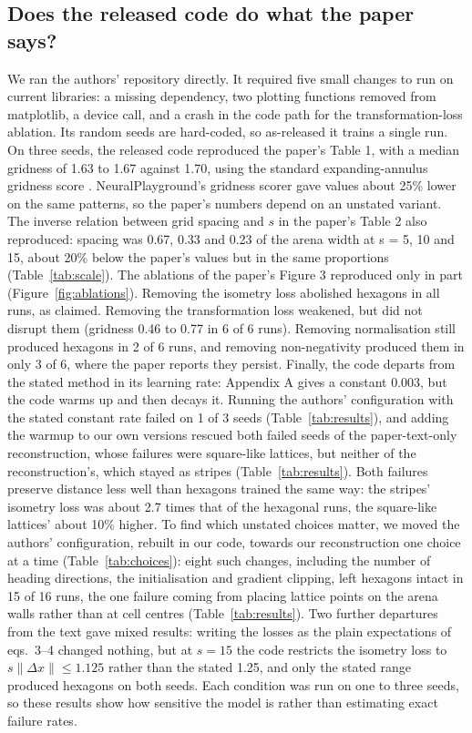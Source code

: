 \documentclass[10pt,letterpaper]{article}
\begin{document}
\subsection{Does the released code do what the paper says?} \label{sec:released}
We ran the authors’ repository directly. It required five small changes to run on current libraries: a missing dependency, two plotting functions removed from matplotlib, a device call, and a crash in the code path for the transformation-loss ablation. Its random seeds are hard-coded, so as-released it trains a single run. On three seeds, the released code reproduced the paper's Table 1, with a median gridness of 1.63 to 1.67 against 1.70, using the standard expanding-annulus gridness score \citep[as in][]{gao2021path}. NeuralPlayground’s gridness scorer gave values about 25\% lower on the same patterns, so the paper’s numbers depend on an unstated variant. The inverse relation between grid spacing and $s$ in the paper's Table 2 also reproduced: spacing was 0.67, 0.33 and 0.23 of the arena width at s = 5, 10 and 15, about 20\% below the paper’s values but in the same proportions (Table~\ref{tab:scale}). The ablations of the paper's Figure 3 reproduced only in part (Figure~\ref{fig:ablations}). Removing the isometry loss abolished hexagons in all runs, as claimed. Removing the transformation loss weakened, but did not disrupt them (gridness 0.46 to 0.77 in 6 of 6 runs). Removing normalisation still produced hexagons in 2 of 6 runs, and removing non-negativity produced them in only 3 of 6, where the paper reports they persist. Finally, the code departs from the stated method in its learning rate: Appendix A gives a constant 0.003, but the code warms up and then decays it. Running the authors’ configuration with the stated constant rate failed on 1 of 3 seeds (Table~\ref{tab:results}), and adding the warmup to our own versions rescued both failed seeds of the paper-text-only reconstruction, whose failures were square-like lattices, but neither of the reconstruction's, which stayed as stripes (Table~\ref{tab:results}). Both failures preserve distance less well than hexagons trained the same way: the stripes' isometry loss was about 2.7 times that of the hexagonal runs, the square-like lattices' about 10\% higher. To find which unstated choices matter, we moved the authors' configuration, rebuilt in our code, towards our reconstruction one choice at a time (Table~\ref{tab:choices}): eight such changes, including the number of heading directions, the initialisation and gradient clipping, left hexagons intact in 15 of 16 runs, the one failure coming from placing lattice points on the arena walls rather than at cell centres (Table~\ref{tab:results}). Two further departures from the text gave mixed results: writing the losses as the plain expectations of eqs.~3--4 changed nothing, but at $s=15$ the code restricts the isometry loss to $s\|\Delta x\| \le 1.125$ rather than the stated 1.25, and only the stated range produced hexagons on both seeds. Each condition was run on one to three seeds, so these results show how sensitive the model is rather than estimating exact failure rates.
\end{document}
